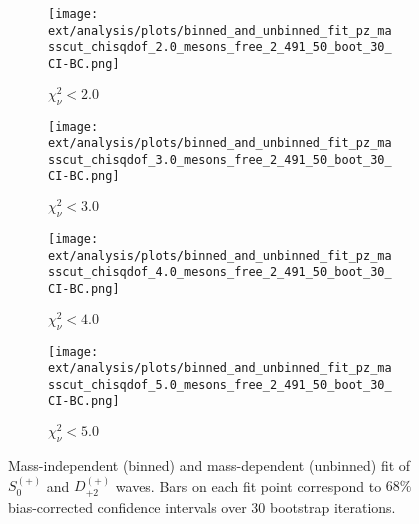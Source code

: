 \begin{figure}[htbp]
    \centering
    \begin{subfigure}{0.45\textwidth}
        \texttt{[image: ext/analysis/plots/binned\_and\_unbinned\_fit\_pz\_masscut\_chisqdof\_2.0\_mesons\_free\_2\_491\_50\_boot\_30\_CI-BC.png]}
        \caption{$\chi^2_\nu < 2.0$}
    \end{subfigure}
    \hfill
    \begin{subfigure}{0.45\textwidth}
        \texttt{[image: ext/analysis/plots/binned\_and\_unbinned\_fit\_pz\_masscut\_chisqdof\_3.0\_mesons\_free\_2\_491\_50\_boot\_30\_CI-BC.png]}
        \caption{$\chi^2_\nu < 3.0$}
    \end{subfigure}
    \vspace{1em}
    \begin{subfigure}{0.45\textwidth}
        \texttt{[image: ext/analysis/plots/binned\_and\_unbinned\_fit\_pz\_masscut\_chisqdof\_4.0\_mesons\_free\_2\_491\_50\_boot\_30\_CI-BC.png]}
        \caption{$\chi^2_\nu < 4.0$}
    \end{subfigure}
    \hfill
    \begin{subfigure}{0.45\textwidth}
        \texttt{[image: ext/analysis/plots/binned\_and\_unbinned\_fit\_pz\_masscut\_chisqdof\_5.0\_mesons\_free\_2\_491\_50\_boot\_30\_CI-BC.png]}
        \caption{$\chi^2_\nu < 5.0$}
    \end{subfigure}

    \caption{Mass-independent (binned) and mass-dependent (unbinned) fit of $S_{0}^{(+)}$ and $D_{+2}^{(+)}$ waves. Bars on each fit point correspond to $68\%$ bias-corrected confidence intervals over $ 30 $ bootstrap iterations.}
    \label{fig:unbinned-fit-all-Sp-D2p}
\end{figure}

